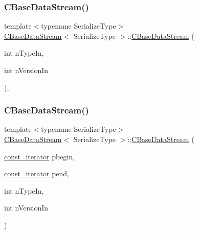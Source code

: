\subsubsection{\texorpdfstring{C\+Base\+Data\+Stream()}{CBaseDataStream()}\hspace{0.1cm}{\footnotesize\ttfamily [1/6]}}
{\footnotesize\ttfamily template$<$typename Serialize\+Type$>$ \\
\mbox{\hyperlink{class_c_base_data_stream}{C\+Base\+Data\+Stream}}$<$ Serialize\+Type $>$\+::\mbox{\hyperlink{class_c_base_data_stream}{C\+Base\+Data\+Stream}} (\begin{DoxyParamCaption}\item[{int}]{n\+Type\+In,  }\item[{int}]{n\+Version\+In }\end{DoxyParamCaption})\hspace{0.3cm}{\ttfamily [inline]}, {\ttfamily [explicit]}}

\mbox{\label{class_c_base_data_stream_ad53847bb8cdede2cdf271f14eb651ba6}} 
\subsubsection{\texorpdfstring{C\+Base\+Data\+Stream()}{CBaseDataStream()}\hspace{0.1cm}{\footnotesize\ttfamily [2/6]}}
{\footnotesize\ttfamily template$<$typename Serialize\+Type$>$ \\
\mbox{\hyperlink{class_c_base_data_stream}{C\+Base\+Data\+Stream}}$<$ Serialize\+Type $>$\+::\mbox{\hyperlink{class_c_base_data_stream}{C\+Base\+Data\+Stream}} (\begin{DoxyParamCaption}\item[{\mbox{\hyperlink{class_c_base_data_stream_a9cf3080c5a75c94568980a59d3aab3ad}{const\+\_\+iterator}}}]{pbegin,  }\item[{\mbox{\hyperlink{class_c_base_data_stream_a9cf3080c5a75c94568980a59d3aab3ad}{const\+\_\+iterator}}}]{pend,  }\item[{int}]{n\+Type\+In,  }\item[{int}]{n\+Version\+In }\end{DoxyParamCaption})\hspace{0.3cm}{\ttfamily [inline]}}


